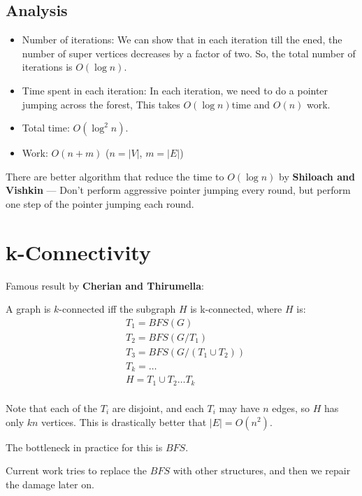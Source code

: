 \subsection{Analysis}
\begin{itemize}
\item Number of iterations: We can show that in each iteration till the ened,
the number of super vertices decreases by a factor of two. So,
the total number of iterations is $O(\log n)$.

\item Time spent in each iteration: In each iteration, we need
to do a pointer jumping across the forest, This takes $O(\log n)$time
and $O(n)$ work.

\item Total time: $O(\log^2 n)$.
\item Work: $O(n + m)$ ($n = |V|$, $m = |E|$)
\end{itemize}

There are better algorithm that reduce the time to $O(\log n)$ by
\textbf{Shiloach and Vishkin} --- Don't perform aggressive pointer jumping every round, but perform one step of the pointer jumping each round.


\section{k-Connectivity}
Famous result by \textbf{Cherian and Thirumella}:

A graph is $k$-connected iff the subgraph $H$ is k-connected, where $H$ is:
\begin{align*}
&T_1 = BFS(G) \\
&T_2 = BFS(G / T_1) \\
&T_3 = BFS(G / (T_1 \cup T_2) ) \\
&T_k = \dots  \\
&H = T_1 \cup T_2 \dots T_k \\
\end{align*}

Note that each of the $T_i$ are disjoint, and each $T_i$
may have $n$ edges, so $H$ has only $kn$ vertices. This is
drastically better that $|E| = O(n^2)$.

The bottleneck in practice for this is $BFS$.

Current work tries to replace the $BFS$ with other structures, and then
we repair the damage later on.